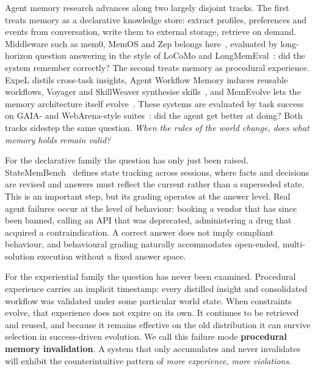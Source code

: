 \documentclass{article} %
\begin{document}
Agent memory research advances along two largely disjoint tracks. The first treats memory as a declarative knowledge store: extract profiles, preferences and events from conversation, write them to external storage, retrieve on demand. Middleware such as mem0, MemOS and Zep belongs here~\citep{chhikara2025mem0,li2025memos,rasmussen2025zep}, evaluated by long-horizon question answering in the style of LoCoMo and LongMemEval~\citep{maharana2024locomo,wu2024longmemeval}: did the system remember correctly? The second treats memory as procedural experience. ExpeL distils cross-task insights, Agent Workflow Memory induces reusable workflows, Voyager and SkillWeaver synthesise skills~\citep{zhao2024expel,wang2024awm,wang2023voyager,zheng2025skillweaver}, and MemEvolve lets the memory architecture itself evolve~\citep{memevolve}. These systems are evaluated by task success on GAIA- and WebArena-style suites~\citep{mialon2023gaia,zhou2023webarena}: did the agent get better at doing? Both tracks sidestep the same question. \emph{When the rules of the world change, does what memory holds remain valid?}

For the declarative family the question has only just been raised. StateMemBench~\citep{statemembench} defines state tracking across sessions, where facts and decisions are revised and answers must reflect the current rather than a superseded state. This is an important step, but its grading operates at the answer level. Real agent failures occur at the level of behaviour: booking a vendor that has since been banned, calling an API that was deprecated, administering a drug that acquired a contraindication. A correct answer does not imply compliant behaviour, and behavioural grading naturally accommodates open-ended, multi-solution execution without a fixed answer space.

For the experiential family the question has never been examined. Procedural experience carries an implicit timestamp: every distilled insight and consolidated workflow was validated under some particular world state. When constraints evolve, that experience does not expire on its own. It continues to be retrieved and reused, and because it remains effective on the old distribution it can survive selection in success-driven evolution. We call this failure mode \textbf{procedural memory invalidation}. A system that only accumulates and never invalidates will exhibit the counterintuitive pattern of \emph{more experience, more violations}.
\end{document}
